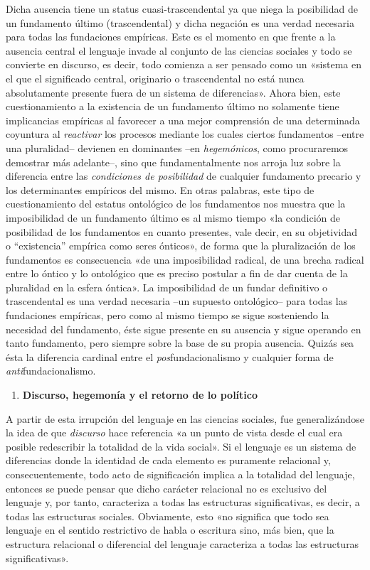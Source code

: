 Dicha ausencia tiene un status cuasi-trascendental ya que niega la posibilidad de un fundamento último (trascendental) y dicha negación es una verdad necesaria para todas las fundaciones empíricas. Este es el momento en que frente a la ausencia central el lenguaje invade al conjunto de las ciencias sociales y todo se convierte en discurso, es decir, todo comienza a ser pensado como un «sistema en el que el significado central, originario o trascendental no está nunca absolutamente presente fuera de un sistema de diferencias». Ahora bien, este cuestionamiento a la existencia de un fundamento último no solamente tiene implicancias empíricas al favorecer a una mejor comprensión de una determinada coyuntura al \emph{reactivar} los procesos mediante los cuales ciertos fundamentos --entre una pluralidad-- devienen en dominantes --en \emph{hegemónicos}, como procuraremos demostrar más adelante--, sino que fundamentalmente nos arroja luz sobre la diferencia entre las \emph{condiciones de posibilidad} de cualquier fundamento precario y los determinantes empíricos del mismo. En otras palabras, este tipo de cuestionamiento del estatus ontológico de los fundamentos nos muestra que la imposibilidad de un fundamento último es al mismo tiempo «la condición de posibilidad de los fundamentos en cuanto presentes, vale decir, en su objetividad o ``existencia'' empírica como seres ónticos», de forma que la pluralización de los fundamentos es consecuencia «de una imposibilidad radical, de una brecha radical entre lo óntico y lo ontológico que es preciso postular a fin de dar cuenta de la pluralidad en la esfera óntica». La imposibilidad de un fundar definitivo o trascendental es una verdad necesaria --un supuesto ontológico-- para todas las fundaciones empíricas, pero como al mismo tiempo se sigue sosteniendo la necesidad del fundamento, éste sigue presente en su ausencia y sigue operando en tanto fundamento, pero siempre sobre la base de su propia ausencia. Quizás sea ésta la diferencia cardinal entre el \emph{pos}fundacionalismo y cualquier forma de \emph{anti}fundacionalismo.

\begin{enumerate}
\def\labelenumi{\arabic{enumi}.}
\item
  \textbf{Discurso, hegemonía y el retorno de lo político}
\end{enumerate}

A partir de esta irrupción del lenguaje en las ciencias sociales, fue generalizándose la idea de que \emph{discurso} hace referencia «a un punto de vista desde el cual era posible redescribir la totalidad de la vida social». Si el lenguaje es un sistema de diferencias donde la identidad de cada elemento es puramente relacional y, consecuentemente, todo acto de significación implica a la totalidad del lenguaje, entonces se puede pensar que dicho carácter relacional no es exclusivo del lenguaje y, por tanto, caracteriza a todas las estructuras significativas, es decir, a todas las estructuras sociales. Obviamente, esto «no significa que todo sea lenguaje en el sentido restrictivo de habla o escritura sino, más bien, que la estructura relacional o diferencial del lenguaje caracteriza a todas las estructuras significativas».

